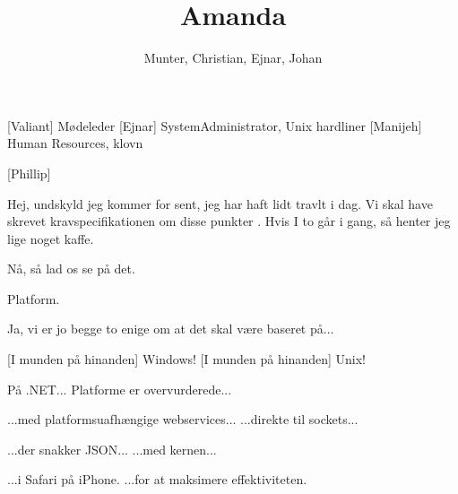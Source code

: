 \documentclass[a4paper,11pt]{article}
\title{Amanda}
\author{Munter, Christian, Ejnar, Johan}
\begin{document}
\maketitle

\begin{roles}
[Valiant] Mødeleder
[Ejnar] SystemAdministrator, Unix hardliner
[Manijeh] Human Resources, klovn
\end{roles}

\begin{props}
[Phillip]
\end{props}

  


\begin{sketch}


 Hej, undskyld jeg kommer for sent, jeg har haft lidt travlt i dag. Vi skal have skrevet kravspecifikationen om disse punkter . Hvis I to går i gang, så henter jeg lige noget kaffe.


 Nå, så lad os se på det.

 Platform.

 Ja, vi er jo begge to enige om at det skal være baseret på...

[I munden på hinanden] Windows!
[I munden på hinanden] Unix!


 På .NET...
 Platforme er overvurderede...

 ...med platformsuafhængige webservices...
 ...direkte til sockets...

 ...der snakker JSON...
 ...med kernen...

 ...i Safari på iPhone.
 ...for at maksimere effektiviteten.



\end{sketch}
\end{document}
